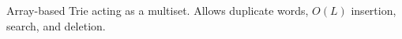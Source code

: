 
Array-based Trie acting as a multiset. Allows duplicate words, $O(L)$ insertion, search, and deletion.


